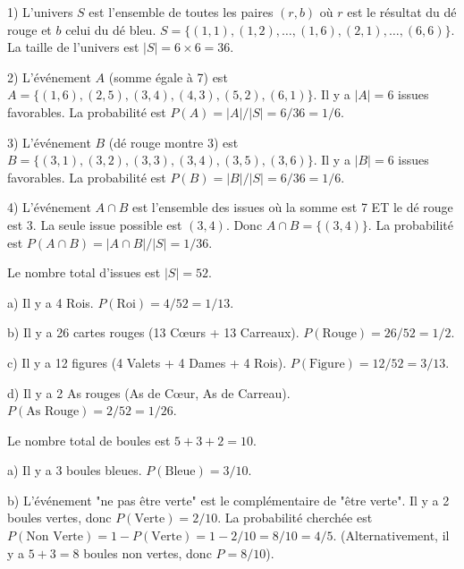 \begin{correctionbox}
1) L'univers $S$ est l'ensemble de toutes les paires $(r, b)$ où $r$ est le résultat du dé rouge et $b$ celui du dé bleu. $S = \{ (1,1), (1,2), \dots, (1,6), (2,1), \dots, (6,6) \}$. La taille de l'univers est $|S| = 6 \times 6 = 36$.

2) L'événement $A$ (somme égale à 7) est $A = \{ (1,6), (2,5), (3,4), (4,3), (5,2), (6,1) \}$. Il y a $|A|=6$ issues favorables. La probabilité est $P(A) = |A|/|S| = 6/36 = 1/6$.

3) L'événement $B$ (dé rouge montre 3) est $B = \{ (3,1), (3,2), (3,3), (3,4), (3,5), (3,6) \}$. Il y a $|B|=6$ issues favorables. La probabilité est $P(B) = |B|/|S| = 6/36 = 1/6$.

4) L'événement $A \cap B$ est l'ensemble des issues où la somme est 7 ET le dé rouge est 3. La seule issue possible est $(3,4)$. Donc $A \cap B = \{ (3,4) \}$. La probabilité est $P(A \cap B) = |A \cap B|/|S| = 1/36$.
\end{correctionbox}

\begin{correctionbox}
Le nombre total d'issues est $|S| = 52$.

a) Il y a 4 Rois. $P(\text{Roi}) = 4/52 = 1/13$.

b) Il y a 26 cartes rouges (13 Cœurs + 13 Carreaux). $P(\text{Rouge}) = 26/52 = 1/2$.

c) Il y a 12 figures (4 Valets + 4 Dames + 4 Rois). $P(\text{Figure}) = 12/52 = 3/13$.

d) Il y a 2 As rouges (As de Cœur, As de Carreau). $P(\text{As Rouge}) = 2/52 = 1/26$.
\end{correctionbox}

\begin{correctionbox}
Le nombre total de boules est $5+3+2 = 10$.

a) Il y a 3 boules bleues. $P(\text{Bleue}) = 3/10$.

b) L'événement "ne pas être verte" est le complémentaire de "être verte". Il y a 2 boules vertes, donc $P(\text{Verte}) = 2/10$. La probabilité cherchée est $P(\text{Non Verte}) = 1 - P(\text{Verte}) = 1 - 2/10 = 8/10 = 4/5$. (Alternativement, il y a $5+3=8$ boules non vertes, donc $P=8/10$).
\end{correctionbox}


